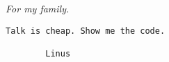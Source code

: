 {
\centering
\it For my family.
\par
}

\vspace{0.25\textheight}

\begin{verbatim}
Talk is cheap. Show me the code.

        Linus
\end{verbatim}

